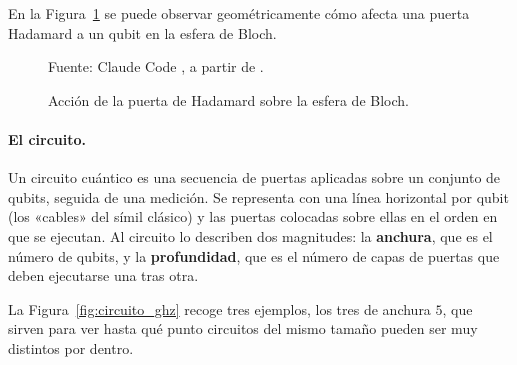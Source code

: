 En la Figura~\ref{fig:hadamard} se puede observar geométricamente cómo afecta una puerta Hadamard a un qubit en la esfera de Bloch.

\begin{figure}[htbp]
    \centering
    

    \caption{Acción de la puerta de Hadamard sobre la esfera de Bloch.}
    \label{fig:hadamard}

    {\footnotesize Fuente: Claude Code \cite{anthropic_claude}, a partir de
    .}
\end{figure}

\paragraph{El circuito.} Un circuito cuántico es una secuencia de puertas aplicadas sobre
un conjunto de qubits, seguida de una medición. Se representa con una línea horizontal por
qubit (los «cables» del símil clásico) y las puertas colocadas sobre ellas en el orden en
que se ejecutan. Al circuito lo describen dos magnitudes: la \textbf{anchura},
que es el número de qubits, y la \textbf{profundidad}, que es el número de capas de puertas
que deben ejecutarse una tras otra.

La Figura~\ref{fig:circuito_ghz} recoge tres ejemplos, los tres de anchura $5$, que sirven
para ver hasta qué punto circuitos del mismo tamaño pueden ser muy distintos por dentro.

